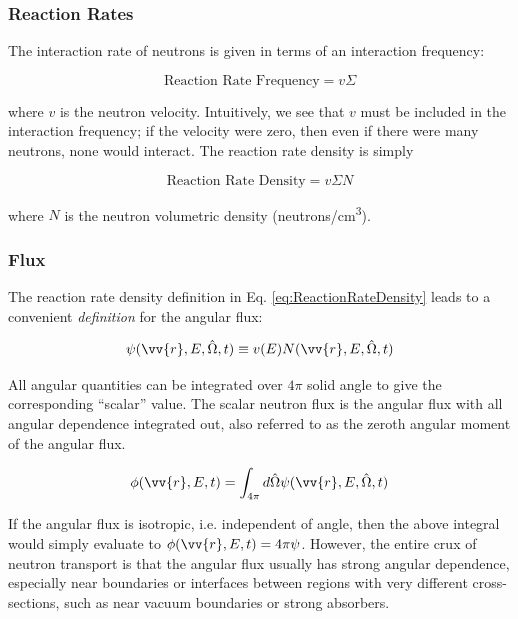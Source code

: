 \documentclass[10pt]{article}
\begin{document}
\begin{flushleft}
\subsubsection{Reaction Rates}

The interaction rate of neutrons is given in terms of an interaction frequency:

\begin{equation}
\label{eq:ReactionFrequency}
\textrm{Reaction Rate Frequency} = v\Sigma
\end{equation}

where \(v\) is the neutron velocity. Intuitively, we see that \(v\) must be included in the interaction frequency; if the velocity were zero, then even if there were many neutrons, none would interact. The reaction rate density is simply

\begin{equation}
\label{eq:ReactionRateDensity}
\textrm{Reaction Rate Density} = v\Sigma N
\end{equation}

where \(N\) is the neutron volumetric density (neutrons/cm\textsuperscript{3}). 

\subsubsection{Flux}

The reaction rate density definition in Eq. \ref{eq:ReactionRateDensity} leads to a convenient \textit{definition} for the angular flux:

\begin{equation}
\label{eq:AngularFlux}
\psi(\vv{r}, E, \hat{\Omega}, t) \equiv v(E)N(\vv{r}, E, \hat{\Omega}, t)
\end{equation}

All angular quantities can be integrated over \(4\pi\) solid angle to give the corresponding ``scalar'' value. The scalar neutron flux is the angular flux with all angular dependence integrated out, also referred to as the zeroth angular moment of the angular flux.

\begin{equation}
\label{eq:ScalarFlux}
\phi(\vv{r}, E, t) = \int_{4\pi}^{} d\hat{\Omega} \psi(\vv{r}, E, \hat{\Omega}, t)
\end{equation}

If the angular flux is isotropic, i.e. independent of angle, then the above integral would simply evaluate to \(\phi(\vv{r}, E, t)=4\pi\psi\). However, the entire crux of neutron transport is that the angular flux usually has strong angular dependence, especially near boundaries or interfaces between regions with very different cross-sections, such as near vacuum boundaries or strong absorbers. 


\end{flushleft}
\end{document}
